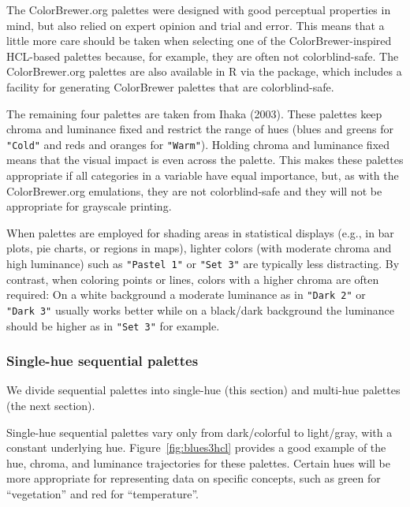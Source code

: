 The ColorBrewer.org palettes were designed with good perceptual properties
in mind, but also relied on expert opinion and trial and error.
This means that a little more care should be taken when selecting one
of the ColorBrewer-inspired HCL-based palettes because, for example,
they are often not colorblind-safe.
The ColorBrewer.org palettes are also available in R via the
 package, which includes a facility for
generating ColorBrewer palettes that are colorblind-safe.

The remaining four palettes are taken from Ihaka (2003). These
palettes keep chroma and luminance fixed and restrict the range
of hues (blues and greens for \texttt{"Cold"} and reds and oranges for
\texttt{"Warm"}). Holding chroma and luminance fixed means that the visual impact
is even across the palette. This makes these palettes appropriate
if all categories in a variable have equal importance, but, as with
the ColorBrewer.org emulations, they are not colorblind-safe and they will not
be appropriate for grayscale printing.

When palettes are employed for shading areas in statistical displays
(e.g., in bar plots, pie charts, or regions in maps), lighter colors
(with moderate chroma and high luminance) such as \texttt{"Pastel\ 1"} or \texttt{"Set\ 3"} are typically less distracting. By contrast, when coloring points
or lines, colors with a higher chroma are often required: On
a white background a moderate luminance as in \texttt{"Dark\ 2"} or \texttt{"Dark\ 3"}
usually works better while on a black/dark background the luminance
should be higher as in \texttt{"Set\ 3"} for example.

\hypertarget{single-hue-sequential-palettes}{%
\subsubsection{Single-hue sequential palettes}\label{single-hue-sequential-palettes}}

We divide sequential palettes into single-hue (this section)
and multi-hue palettes (the next section).

Single-hue sequential palettes vary only from dark/colorful to light/gray, with
a constant underlying hue.
Figure~\ref{fig:blues3hcl} provides a good example of the hue, chroma,
and luminance trajectories for these palettes.
Certain hues will be more
appropriate for representing data on specific concepts, such
as green for ``vegetation'' and red for ``temperature''.

